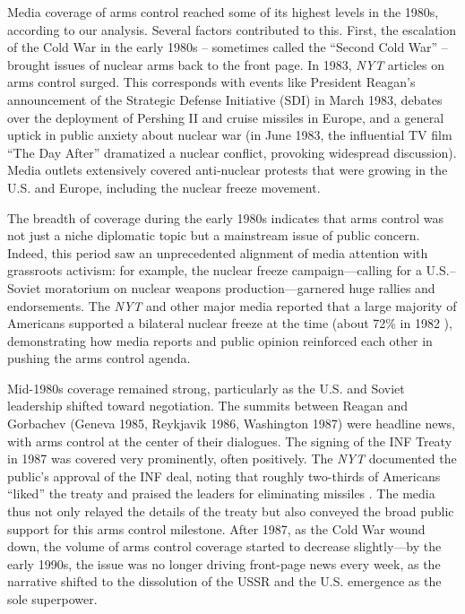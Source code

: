 \documentclass[11,5 pt]{article}
\begin{document}
    Media coverage of arms control reached some of its highest levels in the 1980s, according to our analysis. Several factors contributed to this. First, the escalation of the Cold War in the early 1980s – sometimes called the “Second Cold War” – brought issues of nuclear arms back to the front page. In 1983, \textit{NYT} articles on arms control surged. This corresponds with events like President Reagan’s announcement of the Strategic Defense Initiative (SDI) in March 1983, debates over the deployment of Pershing II and cruise missiles in Europe, and a general uptick in public anxiety about nuclear war (in June 1983, the influential TV film “The Day After” dramatized a nuclear conflict, provoking widespread discussion). Media outlets extensively covered anti-nuclear protests that were growing in the U.S. and Europe, including the nuclear freeze movement. 
    
    The breadth of coverage during the early 1980s indicates that arms control was not just a niche diplomatic topic but a mainstream issue of public concern. Indeed, this period saw an unprecedented alignment of media attention with grassroots activism: for example, the nuclear freeze campaign—calling for a U.S.–Soviet moratorium on nuclear weapons production—garnered huge rallies and endorsements. The \textit{NYT} and other major media reported that a large majority of Americans supported a bilateral nuclear freeze at the time (about 72\% in 1982 \cite{FifthEstate1982}), demonstrating how media reports and public opinion reinforced each other in pushing the arms control agenda.
    
    Mid-1980s coverage remained strong, particularly as the U.S. and Soviet leadership shifted toward negotiation. The summits between Reagan and Gorbachev (Geneva 1985, Reykjavik 1986, Washington 1987) were headline news, with arms control at the center of their dialogues. The signing of the INF Treaty in 1987 was covered very prominently, often positively. The \textit{NYT} documented the public’s approval of the INF deal, noting that roughly two-thirds of Americans “liked” the treaty and praised the leaders for eliminating missiles \cite{TIME1987}. The media thus not only relayed the details of the treaty but also conveyed the broad public support for this arms control milestone. After 1987, as the Cold War wound down, the volume of arms control coverage started to decrease slightly—by the early 1990s, the issue was no longer driving front-page news every week, as the narrative shifted to the dissolution of the USSR and the U.S. emergence as the sole superpower. 
    
\end{document}
